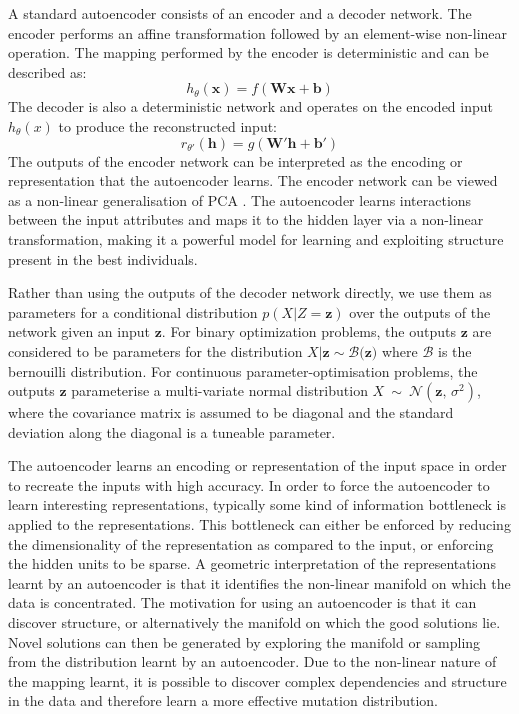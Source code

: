 \documentclass[twoside]{article}
\begin{document}
A standard autoencoder consists of an encoder and a decoder network. The encoder performs an affine transformation followed by an element-wise non-linear operation. The mapping performed by the encoder is deterministic and can be described as: $$h_{\theta}(\mathbf{x}) = f(\mathbf{Wx + b})$$ The decoder is also a deterministic network and operates on the encoded input $h_{\theta}(x)$ to produce the reconstructed input: $$ r_{\theta'}(\mathbf{h}) = g(\mathbf{W'h + b'})$$ The outputs of the encoder network can be interpreted as the encoding or representation that the autoencoder learns. The encoder network can be viewed as a non-linear generalisation of PCA \cite{hinton2006reducing}. The autoencoder learns interactions between the input attributes and maps it to the hidden layer via a non-linear transformation, making it a powerful model for learning and exploiting structure present in the best individuals.

Rather than using the outputs of the decoder network directly, we use them as parameters for a conditional distribution $p(X|Z=\mathbf{z})$ over the outputs of the network given an input $\mathbf{z}$. For binary optimization problems, the outputs $\mathbf{z}$ are considered to be parameters for the distribution $X|\mathbf{z} \sim \mathcal{B(\mathbf{z}})$ where $\mathcal{B}$ is the bernouilli distribution. For continuous parameter-optimisation problems, the outputs $\mathbf z$ parameterise a multi-variate normal distribution $X\ \sim\ \mathcal{N}(\mathbf{z},\,\sigma^2)$, where the covariance matrix is assumed to be diagonal and the standard deviation along the diagonal is a tuneable parameter.

The autoencoder learns an encoding or representation of the input space in order to recreate the inputs with high accuracy. In order to force the autoencoder to learn interesting representations, typically some kind of information bottleneck is applied to the representations. This bottleneck can either be enforced by reducing the dimensionality of the representation as compared to the input, or enforcing the hidden units to be sparse. A geometric interpretation of the representations learnt by an autoencoder is that it identifies the non-linear manifold on which the data is concentrated. The motivation for using an autoencoder is that it can discover structure, or alternatively the manifold on which the good solutions lie. Novel solutions can then be generated by exploring the manifold or sampling from the distribution learnt by an autoencoder. Due to the non-linear nature of the mapping learnt, it is possible to discover complex dependencies and structure in the data and therefore learn a more effective mutation distribution. 
\end{document}
